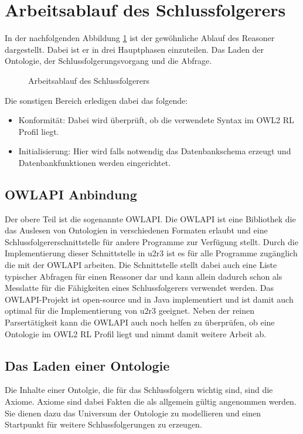 \section{Arbeitsablauf des Schlussfolgerers}

In der nachfolgenden Abbildung \ref{image-u2r3-workflow} ist der gewöhnliche Ablauf des Reasoner dargestellt. Dabei ist er in drei Hauptphasen einzuteilen. Das Laden der Ontologie, der Schlussfolgerungsvorgang und die Abfrage.

\begin{figure}[htp]
	\caption{Arbeitsablauf des Schlussfolgerers}
	\label{image-u2r3-workflow}
\begin{center}
\end{center}
\end{figure}

Die sonstigen Bereich erledigen dabei das folgende:
\begin{itemize}
  \item Konformität: Dabei wird überprüft, ob die verwendete Syntax im OWL2 RL Profil liegt.
  \item Initialisierung: Hier wird falls notwendig das Datenbankschema erzeugt und Datenbankfunktionen werden eingerichtet.
\end{itemize}


\subsection{OWLAPI Anbindung}

Der obere Teil ist die sogenannte OWLAPI. Die OWLAPI ist eine Bibliothek die das Auslesen von Ontologien in verschiedenen Formaten erlaubt und eine Schlussfolgererschnittstelle für andere Programme zur Verfügung stellt. Durch die Implementierung dieser Schnittstelle in u2r3 ist es für alle Programme zugänglich die mit der OWLAPI arbeiten.
Die Schnittstelle stellt dabei auch eine Liste typischer Abfragen für einen Reasoner dar und kann allein dadurch schon als Messlatte für die Fähigkeiten eines Schlussfolgerers verwendet werden. Das OWLAPI-Projekt ist open-source und in Java implementiert und ist damit auch optimal für die Implementierung von u2r3 geeignet. Neben der reinen Parsertätigkeit kann die OWLAPI auch noch helfen zu überprüfen, ob eine Ontologie im OWL2 RL Profil liegt und nimmt damit weitere Arbeit ab.

\subsection{Das Laden einer Ontologie}
\label{abschnitt-laden-einer-ontologie}
Die Inhalte einer Ontolgie, die für das Schlussfolgern wichtig sind, sind die Axiome. Axiome sind dabei Fakten die als allgemein gültig angenommen werden. Sie dienen dazu das Universum der Ontologie zu modellieren und einen Startpunkt für weitere Schlussfolgerungen zu erzeugen.

